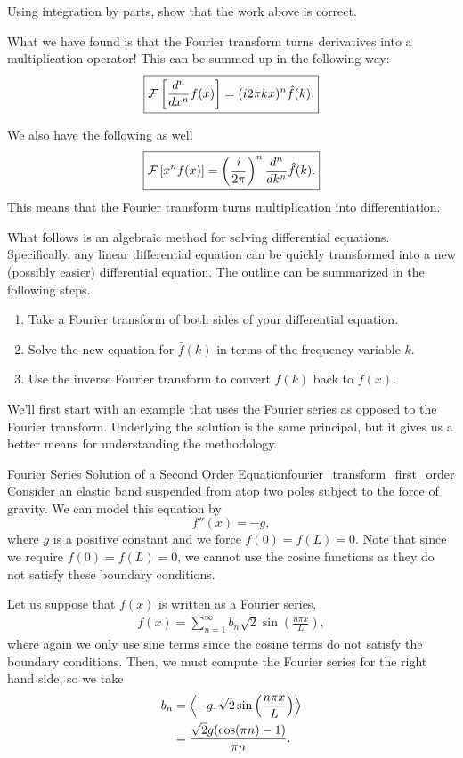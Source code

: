 \begin{exercise}
	Using integration by parts, show that the work above is correct. 
\end{exercise}

What we have found is that the Fourier transform turns derivatives into a multiplication operator! This can be summed up in the following way:
\[
\boxed{\mathcal{F}\left[ \frac{d^n}{dx^n} f(x) \right] = (i2\pi kx)^n \hat{f}(k).}
\]

We also have the following as well
\[
\boxed{\mathcal{F}\left[ x^n f(x) \right] = \left(\frac{i}{2\pi}\right)^n \frac{d^n}{dk^n} \hat{f}(k).}
\]
This means that the Fourier transform turns multiplication into differentiation.  

What follows is an algebraic method for solving differential equations. Specifically, any linear differential equation can be quickly transformed into a new (possibly easier) differential equation. The outline can be summarized in the following steps.
\begin{enumerate}[1.]
	\item Take a Fourier transform of both sides of your differential equation.
	\item Solve the new equation for $\hat{f}(k)$ in terms of the frequency variable $k$.
	\item Use the inverse Fourier transform to convert $\hat{f}(k)$ back to $f(x)$.
\end{enumerate}

We'll first start with an example that uses the Fourier series as opposed to the Fourier transform.  Underlying the solution is the same principal, but it gives us a better means for understanding the methodology.

\begin{ex}{Fourier Series Solution of a Second Order Equation}{fourier_transform_first_order}
	Consider an elastic band suspended from atop two poles subject to the force of gravity. We can model this equation by
	\[
	f''(x) = -g,
	\]
	where $g$ is a positive constant and we force $f(0)=f(L)=0$. Note that since we require $f(0)=f(L)=0$, we cannot use the cosine functions as they do not satisfy these boundary conditions.
	
	Let us suppose that $f(x)$ is written as a Fourier series,
	\begin{align*}
		f(x) = \sum_{n=1}^\infty b_n \sqrt{2}\sin\left(\frac{n \pi x}{L}\right),
	\end{align*}
	where again we only use sine terms since the cosine terms do not satisfy the boundary conditions. Then, we must compute the Fourier series for the right hand side, so we take
	\begin{align*}
	b_n &= \left\langle -g, \sqrt{2}\sin\left(\frac{n\pi x}{L}\right) \right\rangle\\
	&= \frac{\sqrt{2} g (\cos(\pi n)-1)}{\pi n}.
	\end{align*}
	
\end{ex}
	

